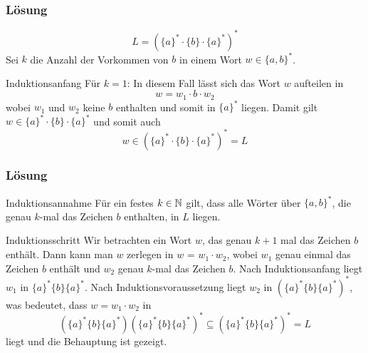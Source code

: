\begin{frame}
	\frametitle{Lösung}
	$$L = (\{a\}^\ast \cdot \{b\} \cdot \{a\}^\ast)^\ast$$
	Sei $k$ die Anzahl der Vorkommen von $b$ in einem Wort $w \in \{a, b\}^\ast$.
	\begin{block}{Induktionsanfang}  \pause
		Für $k = 1$: In diesem Fall lässt sich das Wort $w$ aufteilen in $$w = w_1 \cdot b \cdot w_2$$ wobei $w_1$ und $w_2$ keine $b$ enthalten und somit in $\{a\}^\ast$ liegen. Damit gilt $w \in \{a\}^\ast \cdot \{b\} \cdot \{a\}^\ast$ und somit auch $$w \in (\{a\}^\ast \cdot \{b\} \cdot \{a\}^\ast)^\ast = L$$
	\end{block}
\end{frame}

\begin{frame}
	\frametitle{Lösung}
	\begin{block}{Induktionsannahme}  \pause
		Für ein festes $k \in \mathbb{N}$ gilt, dass alle Wörter über $\{a, b\}^\ast$, die genau $k$-mal das Zeichen $b$ enthalten, in $L$ liegen.
	\end{block} \pause
	\begin{block}{Induktionsschritt}  \pause
		Wir betrachten ein Wort $w$, das genau $k + 1$ mal das Zeichen $b$ enthält. Dann kann man $w$ zerlegen in $w$ = $w_1 \cdot w_2$, wobei $w_1$ genau einmal das Zeichen $b$ enthält und $w_2$ genau $k$-mal das Zeichen $b$. \pause Nach Induktionsanfang liegt $w_1$ in $\{a\}^\ast \{b\}\{a\}^\ast$. Nach Induktionsvoraussetzung liegt $w_2$ in $(\{a\}^\ast \{b\}\{a\}^\ast )^\ast$, was bedeutet, dass $w = w_1 \cdot w_2$ in $$(\{a\}^\ast \{b\}\{a\}^\ast )(\{a\}^\ast \{b\}\{a\}^\ast )^\ast \subseteq (\{a\}^\ast \{b\}\{a\}^\ast )^\ast = L$$ liegt und die Behauptung ist gezeigt.
	\end{block}
\end{frame}

